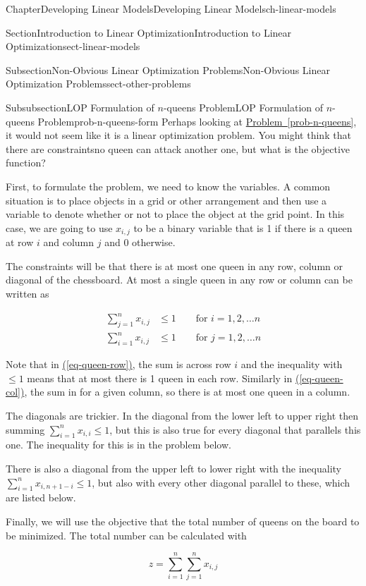 \documentclass[oneside,10pt,]{book}
\newcommand{\xreffont}{\relax}
\numberwithin{equation}{section}
\newcommand{\amp}{&}
\begin{document}
\begin{chapterptx}{Chapter}{Developing Linear Models}{}{Developing Linear Models}{}{}{ch-linear-models}
\begin{sectionptx}{Section}{Introduction to Linear Optimization}{}{Introduction to Linear Optimization}{}{}{sect-linear-models}
\begin{subsectionptx}{Subsection}{Non-Obvious Linear Optimization Problems}{}{Non-Obvious Linear Optimization Problems}{}{}{sect-other-problems}
\begin{subsubsectionptx}{Subsubsection}{LOP Formulation of \(n\)-queens Problem}{}{LOP Formulation of \(n\)-queens Problem}{}{}{prob-n-queens-form}
Perhaps looking at \hyperref[prob-n-queens]{Problem~{\xreffont\ref{prob-n-queens}}}, it would not seem like it is a linear optimization problem. You might think that there are constraints\textemdash{}no queen can attack another one, but what is the objective function?%
\par
First, to formulate the problem, we need to know the variables. A common situation is to place objects in a grid or other arrangement and then use a variable to denote whether or not to place the object at the grid point. In this case, we are going to use \(x_{i,j}\) to be a binary variable that is 1 if there is a queen at row \(i\) and column \(j\) and 0 otherwise.%
\par
The constraints will be that there is at most one queen in any row, column or diagonal of the chessboard. At most a single queen in any row or column can be written as%
\par
%
\begin{align}
\sum_{j=1}^n x_{i,j} \amp \leq 1 \qquad \text{for $i=1, 2, \ldots n$} \label{eq-queen-row}\\
\sum_{i=1}^n x_{i,j} \amp \leq 1 \qquad \text{for $j=1, 2, \ldots n$} \label{eq-queen-col}
\end{align}
%
\par
Note that in \hyperref[eq-queen-row]{({\xreffont\ref{eq-queen-row}})}, the sum is across row \(i\) and the inequality with \(\leq 1\) means that at most there is 1 queen in each row. Similarly in \hyperref[eq-queen-col]{({\xreffont\ref{eq-queen-col}})}, the sum in for a given column, so there is at most one queen in a column.%
\par
The diagonals are trickier. In the diagonal from the lower left to upper right then summing \(\sum_{i=1}^n x_{i,i}  \leq 1 \), but this is also true for every diagonal that parallels this one. The inequality for this is in the problem below.%
\par
There is also a diagonal from the upper left to lower right with the inequality \(\sum_{i=1}^n x_{i,n+1-i} \leq 1\), but also with every other diagonal parallel to these, which are listed below.%
\par
Finally, we will use the objective that the total number of queens on the board to be minimized. The total number can be calculated with%
\par
%
\begin{equation*}
z = \sum_{i=1}^n \sum_{j=1}^n x_{i,j}
\end{equation*}
%
\par

\end{subsubsectionptx}
\end{subsectionptx}
\end{sectionptx}
\end{chapterptx}
\end{document}
